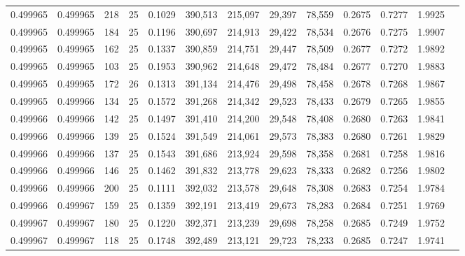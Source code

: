 \begin{tabular}{rrrrrrrrrrrrr}
0.499965 & 0.499965 &   218 &  25 &                                     0.1029 & 390,513 & 215,097 &  29,397 &  78,559 & 0.2675 & 0.7277 & 1.9925 \\
0.499965 & 0.499965 &   184 &  25 &                                     0.1196 & 390,697 & 214,913 &  29,422 &  78,534 & 0.2676 & 0.7275 & 1.9907 \\
0.499965 & 0.499965 &   162 &  25 &                                     0.1337 & 390,859 & 214,751 &  29,447 &  78,509 & 0.2677 & 0.7272 & 1.9892 \\
0.499965 & 0.499965 &   103 &  25 &                                     0.1953 & 390,962 & 214,648 &  29,472 &  78,484 & 0.2677 & 0.7270 & 1.9883 \\
0.499965 & 0.499965 &   172 &  26 &                                     0.1313 & 391,134 & 214,476 &  29,498 &  78,458 & 0.2678 & 0.7268 & 1.9867 \\
0.499965 & 0.499966 &   134 &  25 &                                     0.1572 & 391,268 & 214,342 &  29,523 &  78,433 & 0.2679 & 0.7265 & 1.9855 \\
0.499966 & 0.499966 &   142 &  25 &                                     0.1497 & 391,410 & 214,200 &  29,548 &  78,408 & 0.2680 & 0.7263 & 1.9841 \\
0.499966 & 0.499966 &   139 &  25 &                                     0.1524 & 391,549 & 214,061 &  29,573 &  78,383 & 0.2680 & 0.7261 & 1.9829 \\
0.499966 & 0.499966 &   137 &  25 &                                     0.1543 & 391,686 & 213,924 &  29,598 &  78,358 & 0.2681 & 0.7258 & 1.9816 \\
0.499966 & 0.499966 &   146 &  25 &                                     0.1462 & 391,832 & 213,778 &  29,623 &  78,333 & 0.2682 & 0.7256 & 1.9802 \\
0.499966 & 0.499966 &   200 &  25 &                                     0.1111 & 392,032 & 213,578 &  29,648 &  78,308 & 0.2683 & 0.7254 & 1.9784 \\
0.499966 & 0.499967 &   159 &  25 &                                     0.1359 & 392,191 & 213,419 &  29,673 &  78,283 & 0.2684 & 0.7251 & 1.9769 \\
0.499967 & 0.499967 &   180 &  25 &                                     0.1220 & 392,371 & 213,239 &  29,698 &  78,258 & 0.2685 & 0.7249 & 1.9752 \\
0.499967 & 0.499967 &   118 &  25 &                                     0.1748 & 392,489 & 213,121 &  29,723 &  78,233 & 0.2685 & 0.7247 & 1.9741 \\

\end{tabular}
